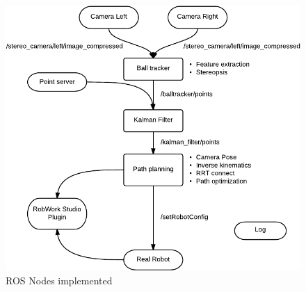 \begin{figure}[htb]
	\centering
	\includegraphics[width=\textwidth]{figures/ros_nodes}
	\caption{ROS Nodes implemented}
	\label{fig:ros_nodes}
\end{figure}
